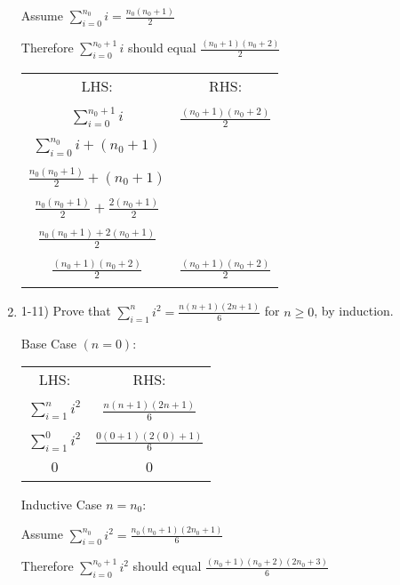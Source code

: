 \documentclass{article}
\begin{document}
\begin{enumerate}
        Assume $ \sum_{i=0}^{n_0} i = \frac{n_0(n_0+1)}{2} $

        Therefore $ \sum_{i=0}^{n_0+1} i $ should equal $ \frac{(n_0+1)(n_0+2)}{2} $

    \begin{center}
        \begin{tabular}{ c | c } 
        LHS: & RHS: \\ \\
        $ \sum_{i=0}^{n_0+1} i $ & $ \frac{(n_0+1)(n_0+2)}{2} $ \\ \\
        $ \sum_{i=0}^{n_0} i + (n_0+1) $ & \\ \\
        $ \frac{n_0(n_0+1)}{2} + (n_0+1) $ & \\ \\
        $ \frac{n_0(n_0+1)}{2} + \frac{2(n_0+1)}{2} $ & \\ \\
        $ \frac{n_0(n_0+1)+2(n_0+1)}{2} $ & \\ \\
        $ \boxed{\frac{(n_0+1)(n_0+2)}{2}} $ & $ \boxed{\frac{(n_0+1)(n_0+2)}{2}} $\\ \\
        \end{tabular}
    \end{center}
    \item 1-11) Prove that $\sum_{i=1}^{n}i^2=\frac{n(n+1)(2n+1)}{6} $ for $n \ge 0 $, by induction.
    
    Base Case $(n = 0)$:
    \begin{center}
        \begin{tabular}{ c | c } 
        LHS: & RHS: \\ & \\
        $ \sum_{i=1}^{n}i^2 $ & $ \frac{n(n+1)(2n+1)}{6}$ \\ \\
        $ \sum_{i=1}^{0}i^2 $ & $ \frac{0(0+1)(2(0)+1)}{6}$ \\ \\
        $ 0 $ & $ 0 $ \\ \\
        \end{tabular}
    \end{center}
    Inductive Case $ n = n_0 $:
    
        Assume $ \sum_{i=0}^{n_0} i^2 = \frac{n_0(n_0+1)(2n_0+1)}{6} $

        Therefore $ \sum_{i=0}^{n_0+1} i^2 $ should equal $ \frac{(n_0+1)(n_0+2)(2n_0+3)}{6} $


\end{enumerate}
\end{document}

